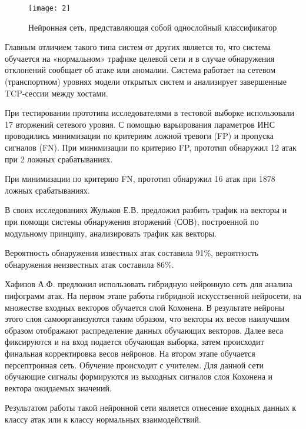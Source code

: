 \begin{figure}[h!]
    \centering
    \texttt{[image: 2]}
    \caption{Нейронная сеть, представляющая собой однослойный классификатор}
    \label{img:2}
\end{figure} 

Главным отличием такого типа систем от других является то, что система обучается на «нормальном» трафике целевой сети и в случае обнаружения отклонений сообщает об атаке или аномалии. Система работает на сетевом (транспортном) уровнях модели открытых систем и анализирует завершенные TCP-сессии между хостами.\par 

При тестировании прототипа исследователями в тестовой выборке использовали 17 вторжений сетевого уровня. С помощью варьирования параметров ИНС проводились минимизации по критериям ложной тревоги (FP) и пропуска сигналов (FN). При минимизации по критерию FP, прототип обнаружил 12 атак при 2 ложных срабатываниях.\par 

При минимизации по критерию FN, прототип обнаружил 16 атак при 1878 ложных срабатываниях.\par 

В своих исследованиях Жульков Е.В. предложил разбить трафик на векторы и при помощи системы обнаружения вторжений (СОВ), построенной по модульному принципу, анализировать трафик как векторы. \par 

Вероятность обнаружения известных атак составила 91\%, вероятность обнаружения неизвестных атак составила 86\%.\par 

Хафизов А.Ф. предложил использовать гибридную нейронную сеть для анализа пифограмм атак. На первом этапе работы гибридной искусственной нейросети, на множестве входных векторов обучается слой Кохонена. В результате нейроны этого слоя самоорганизуются таким образом, что векторы их весов наилучшим образом отображают распределение данных обучающих векторов. Далее веса фиксируются и на вход подается обучающая выборка, затем происходит финальная корректировка весов нейронов. На втором этапе обучается персептронная сеть. Обучение происходит с учителем. Для данной сети обучающие сигналы формируются из выходных сигналов слоя Кохонена и вектора ожидаемых значений.\par 

Результатом работы такой нейронной сети является отнесение входных данных к классу атак или к классу нормальных взаимодействий.\par 

